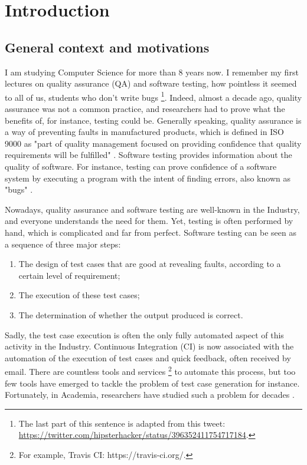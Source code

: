 %
\chapter{Introduction}
\label{sec:intro}

\minitoc

\section{General context and motivations}

I am studying Computer Science for more than 8 years now. I
remember my first lectures on quality assurance (QA) and software
testing, how pointless it seemed to all of us, students who don't
write bugs \footnote{The last part of this sentence is adapted
from this tweet:
\url{https://twitter.com/hipsterhacker/status/396352411754717184}.}.
Indeed, almost a decade ago, quality assurance was not a common
practice, and researchers had to prove what the benefits of, for
instance, testing could be. Generally speaking, quality assurance
is a way of preventing faults in manufactured products, which is
defined in ISO 9000 as "part of quality management focused on
providing confidence that quality requirements will be fulfilled"
\cite{iso20059000}. Software testing provides information about
the quality of software. For instance, testing can prove
confidence of a software system by executing a program with the
intent of finding errors, also known as "bugs"
\cite{Myers:1979:AST:539883}.

Nowadays, quality assurance and software testing are well-known
in the Industry, and everyone understands the need for them.
Yet, testing is often performed by hand, which is complicated
and far from perfect. Software testing can be seen as a sequence
of three major steps:

\begin{enumerate}
    \item The design of test cases that are good at revealing
        faults, according to a certain level of requirement;

    \item The execution of these test cases;

    \item The determination of whether the output produced is
        correct.
\end{enumerate}

Sadly, the test case execution is often the only fully automated
aspect of this activity in the Industry. Continuous Integration
(CI) \cite{booch1991object} is now associated with the automation
of the execution of test cases and quick feedback, often received
by email. There are countless tools and services
\footnote{For example, Travis CI: https://travis-ci.org/.} to
automate this process, but too few tools have emerged to tackle
the problem of test case generation for instance. Fortunately, in
Academia, researchers have studied such a problem for decades
\cite{4221614}.

